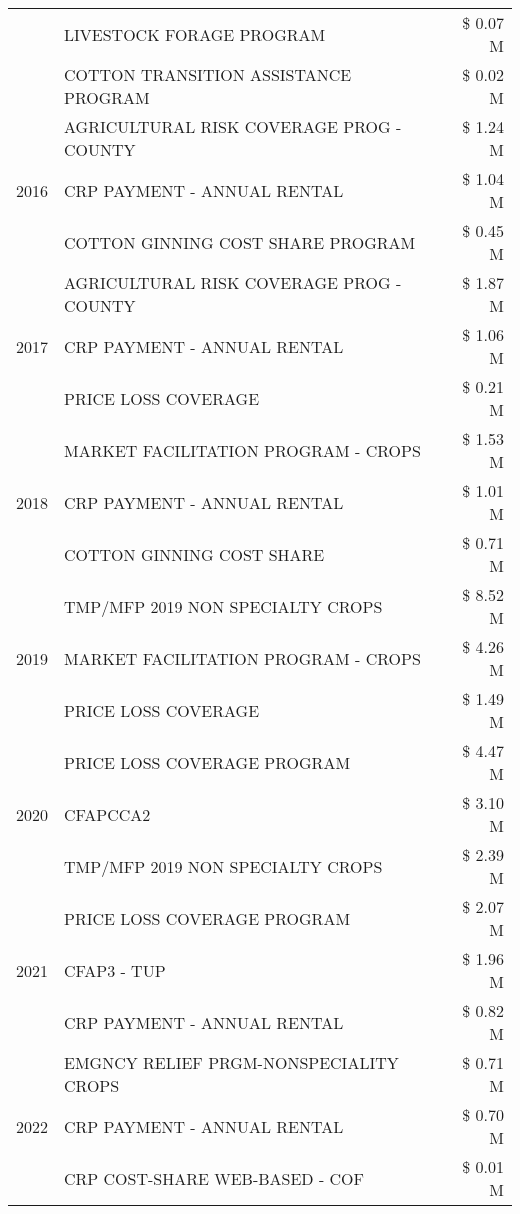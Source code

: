 \begin{tabular}{llr}
 & LIVESTOCK FORAGE PROGRAM & \$ 0.07 M \\
 & COTTON TRANSITION ASSISTANCE PROGRAM & \$ 0.02 M \\
\cline{1-3}
\multirow[t]{3}{*}{2016} & AGRICULTURAL RISK COVERAGE PROG - COUNTY & \$ 1.24 M \\
 & CRP PAYMENT - ANNUAL RENTAL & \$ 1.04 M \\
 & COTTON GINNING COST SHARE PROGRAM & \$ 0.45 M \\
\cline{1-3}
\multirow[t]{3}{*}{2017} & AGRICULTURAL RISK COVERAGE PROG - COUNTY & \$ 1.87 M \\
 & CRP PAYMENT - ANNUAL RENTAL & \$ 1.06 M \\
 & PRICE LOSS COVERAGE & \$ 0.21 M \\
\cline{1-3}
\multirow[t]{3}{*}{2018} & MARKET FACILITATION PROGRAM - CROPS & \$ 1.53 M \\
 & CRP PAYMENT - ANNUAL RENTAL & \$ 1.01 M \\
 & COTTON GINNING COST SHARE & \$ 0.71 M \\
\cline{1-3}
\multirow[t]{3}{*}{2019} & TMP/MFP 2019 NON SPECIALTY CROPS & \$ 8.52 M \\
 & MARKET FACILITATION PROGRAM - CROPS & \$ 4.26 M \\
 & PRICE LOSS COVERAGE & \$ 1.49 M \\
\cline{1-3}
\multirow[t]{3}{*}{2020} & PRICE LOSS COVERAGE PROGRAM & \$ 4.47 M \\
 & CFAPCCA2 & \$ 3.10 M \\
 & TMP/MFP 2019 NON SPECIALTY CROPS & \$ 2.39 M \\
\cline{1-3}
\multirow[t]{3}{*}{2021} & PRICE LOSS COVERAGE PROGRAM & \$ 2.07 M \\
 & CFAP3 - TUP & \$ 1.96 M \\
 & CRP PAYMENT - ANNUAL RENTAL & \$ 0.82 M \\
\cline{1-3}
\multirow[t]{3}{*}{2022} & EMGNCY RELIEF PRGM-NONSPECIALITY CROPS & \$ 0.71 M \\
 & CRP PAYMENT - ANNUAL RENTAL & \$ 0.70 M \\
 & CRP COST-SHARE WEB-BASED - COF & \$ 0.01 M \\
\cline{1-3}
\bottomrule
\end{tabular}
